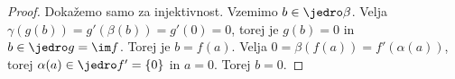 \begin{proof}
  Dokažemo samo za injektivnost.
  Vzemimo $b \in \jedro \beta$.
  Velja $\gamma(g(b)) = g'(\beta(b)) = g'(0) = 0$, torej je $g(b) = 0$ in $b \in
  \jedro g = \im f$.
  Torej je $b = f(a)$.
  Velja $0 = \beta(f(a)) = f'(\alpha(a))$, torej $\alpha(a) \in \jedro f' =
  \{0\}$ in $a = 0$.
  Torej $b = 0$.
\end{proof}


